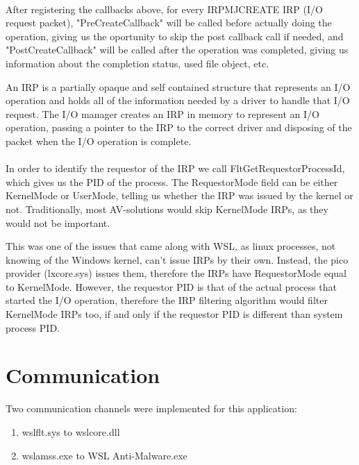     \paragraph{}
    After registering the callbacks above, for every IRP\textunderscore MJ\textunderscore CREATE IRP (I/O request packet), "PreCreateCallback"
    will be called before actually doing the operation, giving us the oportunity to skip the post callback call if needed, and
    "PostCreateCallback" will be called after the operation was completed, giving us information about the completion status, used file object,
    etc.

    An IRP is a partially opaque and self contained structure that represents an I/O operation and holds all of the information needed by
    a driver to handle that I/O request. The I/O manager creates an IRP in memory to represent an I/O operation, passing a pointer to the
    IRP to the correct driver and disposing of the packet when the I/O operation is complete\cite{WindowsInternals62}.

    \paragraph{}
    In order to identify the requestor of the IRP we call FltGetRequestorProcessId, which gives us the PID of the process. The RequestorMode
    field can be either KernelMode or UserMode, telling us whether the IRP was issued by the kernel or not. Traditionally, most AV-solutions
    would skip KernelMode IRPs, as they would not be important.
    
    This was one of the issues that came along with WSL, as linux processes, not knowing of the Windows kernel, can't issue IRPs by their own.
    Instead, the pico provider (lxcore.sys) issues them, therefore the IRPs have  RequestorMode equal to KernelMode. However, the requestor PID
    is that of the actual process that started the I/O operation, therefore the IRP filtering algorithm would filter KernelMode IRPs too, if
    and only if the requestor PID is different than system process PID.

    \pagebreak

    \section{Communication}
        
        Two communication channels were implemented for this application:
        \begin{enumerate}
            \item wslflt.sys to wslcore.dll
            \item wslamss.exe to WSL Anti-Malware.exe
        \end{enumerate}


